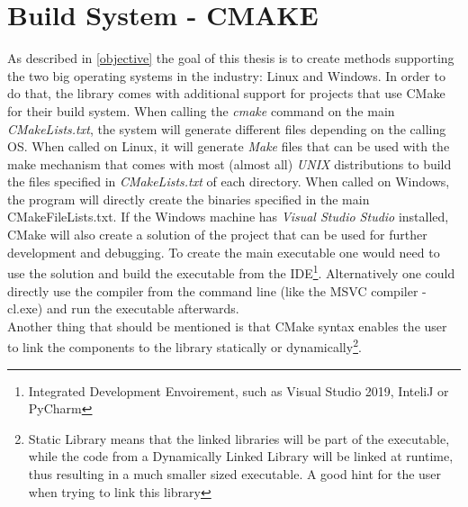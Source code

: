 \section{Build System - CMAKE}
As described in \ref{objective} the goal of this thesis is to create methods supporting the two big operating systems in the industry: Linux and Windows. In order to do that, the library comes with additional support for projects that use CMake for their build system. When calling the \textit{cmake} command on the main \textit{CMakeLists.txt}, the system will generate different files depending on the calling OS. When called on Linux, it will generate \textit{Make} files that can be used with the make mechanism that comes with most (almost all) \textit{UNIX} distributions to build the files specified in \textit{CMakeLists.txt} of each directory. When called on Windows, the program will directly create the binaries specified in the main CMakeFileLists.txt. If the Windows machine has \textit{Visual Studio Studio} installed, CMake will also create a solution of the project that can be used for further development and debugging. To create the main executable one would need to use the solution and build the executable from the IDE\footnote{Integrated Development Envoirement, such as Visual Studio 2019, InteliJ or PyCharm}. Alternatively one could directly use the compiler from the command line (like the MSVC compiler - cl.exe) and run the executable afterwards.\\
Another thing that should be mentioned is that CMake syntax enables the user to link the components to the library statically or dynamically\footnote{Static Library means that the linked libraries will be part of the executable, while the code from a Dynamically Linked Library will be linked at runtime, thus resulting in a much smaller sized executable. A good hint for the user when trying to link this library}. 
